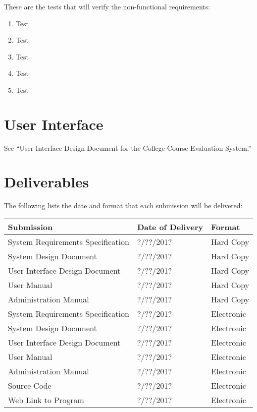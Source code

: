 \documentclass{article}
\begin{document}
These are the tests that will verify the non-functional requirements:

\begin{enumerate}
  \item Test
  \item Test
  \item Test
  \item Test
  \item Test
\end{enumerate}

\section{User Interface}

See ``User Interface Design Document for the College Course Evaluation System.''

\section{Deliverables}

The following lists the date and format that each submission will be delivered:

\begin{center}
\begin{tabular}{|p{6cm}|p{3cm}|p{3cm}|} 
\hline
\textbf{Submission} & \textbf{Date of Delivery} & \textbf{Format} \\
\hline
System Requirements Specification & ?/??/201? & Hard Copy\\ 
\hline
System Design Document & ?/??/201? & Hard Copy\\ 
\hline
User Interface Design Document & ?/??/201? & Hard Copy\\ 
\hline
User Manual & ?/??/201? & Hard Copy\\ 
\hline
Administration Manual & ?/??/201? & Hard Copy\\ 
\hline
System Requirements Specification & ?/??/201? & Electronic\\ 
\hline
System Design Document & ?/??/201? & Electronic\\ 
\hline
User Interface Design Document & ?/??/201? & Electronic\\ 
\hline
User Manual & ?/??/201? & Electronic\\ 
\hline
Administration Manual & ?/??/201? & Electronic\\ 
\hline
Source Code & ?/??/201? & Electronic\\ 
\hline
Web Link to Program & ?/??/201? & Electronic\\ 
\hline
\end{tabular}
\end{center}
\end{document}
